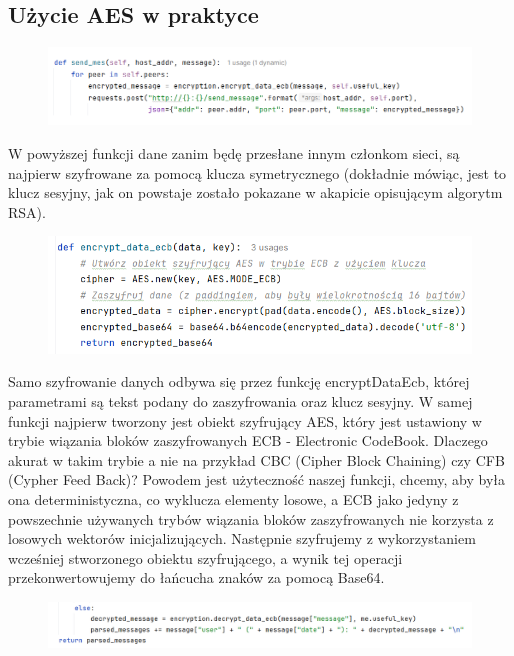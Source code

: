 \subsection{Użycie AES w praktyce}
\begin{figure}[H]
    \centering
    \includegraphics[width=\textwidth]{Images/CodeX20.png}
\end{figure}
W powyższej funkcji dane zanim będę przesłane innym członkom sieci, są najpierw szyfrowane za pomocą klucza symetrycznego (dokładnie mówiąc, jest to klucz sesyjny, jak on powstaje zostało pokazane w akapicie opisującym algorytm RSA).
\begin{figure}[H]
    \centering
    \includegraphics[width=\textwidth]{Images/CodeX21.png}
\end{figure}
Samo szyfrowanie danych odbywa się przez funkcję encryptDataEcb, której parametrami są tekst podany do zaszyfrowania oraz klucz sesyjny. W samej funkcji najpierw tworzony jest obiekt szyfrujący AES, który jest ustawiony w trybie wiązania bloków zaszyfrowanych ECB - Electronic CodeBook. Dlaczego akurat w takim trybie a nie na przykład CBC (Cipher Block Chaining) czy CFB (Cypher Feed Back)? Powodem jest użyteczność naszej funkcji, chcemy, aby była ona deterministyczna, co wyklucza elementy losowe, a ECB jako jedyny z powszechnie używanych trybów wiązania bloków zaszyfrowanych nie korzysta z losowych wektorów inicjalizujących. Następnie szyfrujemy z wykorzystaniem wcześniej stworzonego obiektu szyfrującego, a wynik tej operacji przekonwertowujemy do łańcucha znaków za pomocą Base64.
\begin{figure}[H]
    \centering
    \includegraphics[width=\textwidth]{Images/CodeX22.png}
\end{figure}
